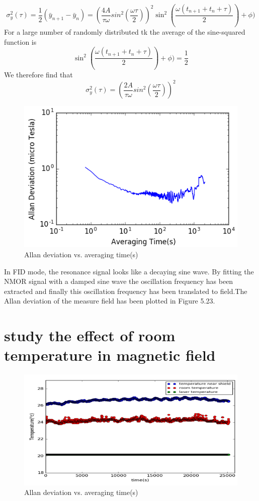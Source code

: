 \begin{equation}
{\sigma_y^2(\tau)}=\frac{1}{2}(\bar{y}_{n+1}-\bar{y}_{n})=(\frac{4A}
{\tau \omega}sin^2(\frac{\omega \tau}{2}))^2 \sin^2     (\frac{\omega(t_{n+1} +t_{n}+\tau)}{2})+\phi)
\end{equation}
For a large number of randomly
distributed tk the average of the sine-squared function is
\begin{equation}
\sin^2    (\frac{\omega(t_{n+1} +t_{n}+\tau)}{2})+\phi)=\frac{1}{2}
\end{equation}
We therefore find that
\begin{equation}
{\sigma_y^2(\tau)}=(\frac{2A}
{\tau \omega}sin^2(\frac{\omega \tau}{2}))^2
\end{equation}
\begin{figure}[h]
\centering\includegraphics[width=0.6\linewidth]{figures/allan_plot}
\caption{Allan deviation vs. averaging time(s)}
\end{figure}
In FID mode, the resonance signal looks like a decaying sine wave. By fitting the NMOR signal with a damped sine wave the oscillation frequency has been extracted and finally this oscillation frequency has been translated to field.The Allan deviation of the measure field has been plotted in Figure 5.23.
\newpage
  \section{study the effect of room temperature in magnetic field} 
  \begin{figure}[h]
\centering\includegraphics[width=0.6\linewidth]{figures/temp}
\caption{Allan deviation vs. averaging time(s)}
\end{figure}
\newpage
